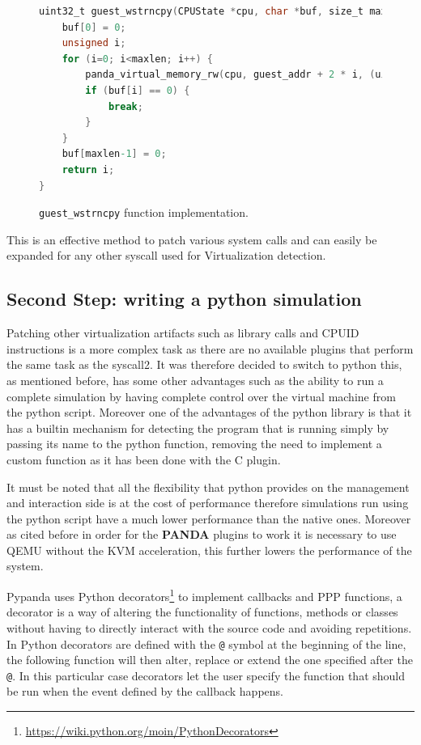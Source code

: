 \begin{figure}[htp]
\centering
\begin{lstlisting}[language=C] 
uint32_t guest_wstrncpy(CPUState *cpu, char *buf, size_t maxlen, target_ulong guest_addr) {
    buf[0] = 0;
    unsigned i;
    for (i=0; i<maxlen; i++) {
        panda_virtual_memory_rw(cpu, guest_addr + 2 * i, (uint8_t *)&buf[i], 1, 0);
        if (buf[i] == 0) {
            break;
        }
    }
    buf[maxlen-1] = 0;
    return i;
}
\end{lstlisting}
\caption{\lstinline{guest_wstrncpy} function implementation.}
\label{fig:gstrin}
\end{figure}

This is an effective method to patch various system calls and can easily be expanded for any other syscall used for Virtualization detection.


\subsection{Second Step: writing a python simulation}

Patching other virtualization artifacts such as library calls and CPUID instructions is a more complex task as there are no available plugins that perform the same task as the syscall2. It was therefore decided to switch to python this, as mentioned before, has some other advantages such as the ability to run a complete simulation by having complete control over the virtual machine from the python script. Moreover one of the advantages of the python library is that it has a builtin mechanism for detecting the program that is running simply by passing its name to the python function, removing the need to implement a custom function as it has been done with the C plugin.

It must be noted that all the flexibility that python provides on the management and interaction side is at the cost of performance therefore simulations run using the python script have a much lower performance than the native ones. Moreover as cited before in order for the \textbf{PANDA} plugins to work it is necessary to use QEMU without the KVM acceleration, this further lowers the performance of the system. 

Pypanda uses Python decorators\footnote{\url{https://wiki.python.org/moin/PythonDecorators}} to implement callbacks and PPP functions, a decorator is a way of altering the functionality of functions, methods or classes without having to directly interact with the source code and avoiding repetitions. In Python decorators are defined with the \lstinline{@} symbol at the beginning of the line, the following function will then alter, replace or extend the one specified after the \lstinline{@}. In this particular case decorators let the user specify the function that should be run when the event defined by the callback happens. 

